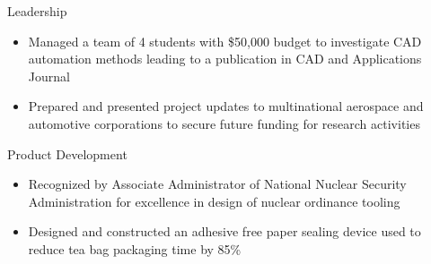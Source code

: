 \documentclass[]{friggeri-cv}
\begin{document}
\begin{entrylist}
    \entry
    {}
    {Leadership}
    {}
    {\vspace{-4mm}
    \begin{itemize}
    \item Managed a team of 4 students with \$50,000 budget to investigate CAD automation methods leading to a publication in CAD and Applications Journal
    \item Prepared and presented project updates to multinational aerospace and automotive corporations to secure future funding for research activities
    \end{itemize}\vspace{1mm}}





    \entry
    {}
    {Product Development}
    {}
    {\vspace{-4mm}
    \begin{itemize}
        \item Recognized by Associate Administrator of National Nuclear Security Administration for excellence in design of nuclear ordinance tooling
        \item Designed and constructed an adhesive free paper sealing device used to reduce tea bag packaging time by 85\%
    \end{itemize}
    \vspace{1mm}}



\end{entrylist}
\end{document}
